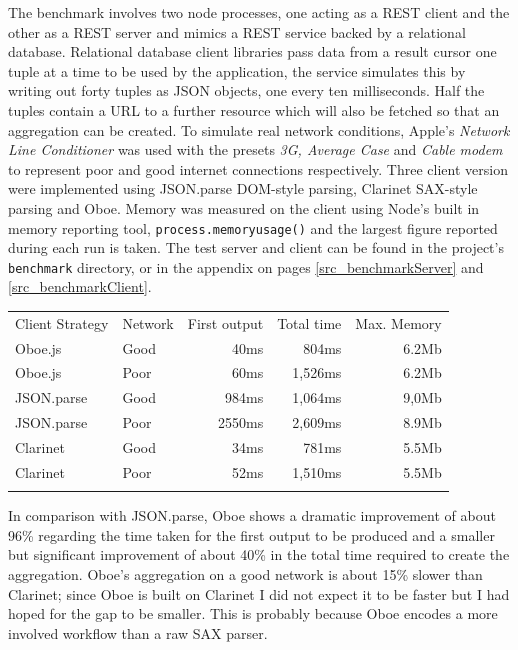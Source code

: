 \documentclass[12pt, ]{article}
\begin{document}
The benchmark involves two node processes, one acting as a REST client
and the other as a REST server and mimics a REST service backed by a
relational database. Relational database client libraries pass data from
a result cursor one tuple at a time to be used by the application, the
service simulates this by writing out forty tuples as JSON objects, one
every ten milliseconds. Half the tuples contain a URL to a further
resource which will also be fetched so that an aggregation can be
created. To simulate real network conditions, Apple's \emph{Network Line
Conditioner} was used with the presets \emph{3G, Average Case} and
\emph{Cable modem} to represent poor and good internet connections
respectively. Three client version were implemented using JSON.parse
DOM-style parsing, Clarinet SAX-style parsing and Oboe. Memory was
measured on the client using Node's built in memory reporting tool,
\texttt{process.memoryusage()} and the largest figure reported during
each run is taken. The test server and client can be found in the
project's \texttt{benchmark} directory, or in the appendix on pages
\ref{src_benchmarkServer} and \ref{src_benchmarkClient}.

\begin{longtable}[c]{@{}llrrr@{}}
\hline\noalign{\medskip}
Client Strategy & Network & First output & Total time & Max. Memory
\\\noalign{\medskip}
\hline\noalign{\medskip}
Oboe.js & Good & 40ms & 804ms & 6.2Mb
\\\noalign{\medskip}
Oboe.js & Poor & 60ms & 1,526ms & 6.2Mb
\\\noalign{\medskip}
JSON.parse & Good & 984ms & 1,064ms & 9,0Mb
\\\noalign{\medskip}
JSON.parse & Poor & 2550ms & 2,609ms & 8.9Mb
\\\noalign{\medskip}
Clarinet & Good & 34ms & 781ms & 5.5Mb
\\\noalign{\medskip}
Clarinet & Poor & 52ms & 1,510ms & 5.5Mb
\\\noalign{\medskip}
\hline
\end{longtable}

In comparison with JSON.parse, Oboe shows a dramatic improvement of
about 96\% regarding the time taken for the first output to be produced
and a smaller but significant improvement of about 40\% in the total
time required to create the aggregation. Oboe's aggregation on a good
network is about 15\% slower than Clarinet; since Oboe is built on
Clarinet I did not expect it to be faster but I had hoped for the gap to
be smaller. This is probably because Oboe encodes a more involved
workflow than a raw SAX parser.
\end{document}
